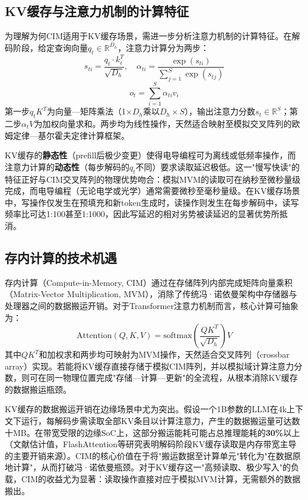 \subsection{KV缓存与注意力机制的计算特征}

为理解为何CIM适用于KV缓存场景，需进一步分析注意力机制的计算特征。在解码阶段，给定查询向量$q_t \in \mathbb{R}^{D_h}$，注意力计算分为两步：
\begin{equation}
s_{ti} = \frac{q_t \cdot k_i^T}{\sqrt{D_h}}, \quad \alpha_{ti} = \frac{\exp(s_{ti})}{\sum_{j=1}^{S} \exp(s_{tj})}
\label{eq:attention_scores}
\end{equation}
\begin{equation}
o_t = \sum_{i=1}^{S} \alpha_{ti} v_i
\label{eq:attention_output_detail}
\end{equation}
第一步$q_t K^T$为向量—矩阵乘法（1$\times D_h$乘以$D_h \times S$），输出注意力分数$s_t \in \mathbb{R}^S$；第二步$\alpha_t V$为加权向量求和。两步均为线性操作，天然适合映射至模拟交叉阵列的欧姆定律—基尔霍夫定律计算框架。

KV缓存的\textbf{静态性}（prefill后极少变更）使得电导编程可为离线或低频率操作，而注意力计算的\textbf{动态性}（每步解码的$q_t$不同）要求读取延迟极低。这一"慢写快读"的特征正好与CIM交叉阵列的物理优势吻合：模拟MVM的读取可在纳秒至微秒量级完成，而电导编程（无论电学或光学）通常需要微秒至毫秒量级。在KV缓存场景中，写操作仅发生在预填充和新token生成时，读操作则发生在每步解码中，读写频率比可达1:100甚至1:1000，因此写延迟的相对劣势被读延迟的显著优势所抵消。

\subsection{存内计算的技术机遇}

存内计算（Compute-in-Memory, CIM）通过在存储阵列内部完成矩阵向量乘积（Matrix-Vector Multiplication, MVM），消除了传统冯·诺依曼架构中存储器与处理器之间的数据搬运开销。对于Transformer注意力机制而言，核心计算可抽象为：
\begin{equation}
\text{Attention}(Q, K, V) = \text{softmax}\left(\frac{QK^T}{\sqrt{D_h}}\right)V
\label{eq:attention}
\end{equation}
其中$QK^T$和加权求和两步均可映射为MVM操作，天然适合交叉阵列（crossbar array）实现。若能将KV缓存直接存储于模拟CIM阵列，并以模拟域计算注意力分数，则可在同一物理位置完成"存储—计算—更新"的全流程，从根本消除KV缓存的数据搬运瓶颈。

KV缓存的数据搬运开销在边缘场景中尤为突出。假设一个1B参数的LLM在4k上下文下运行，每解码步需读取全部KV条目以计算注意力，产生的数据搬运量可达数十MB。在带宽受限的边缘SoC上，这部分搬运能耗可能占总推理能耗的\textbf{30\%}以上（文献估计值，FlashAttention等研究表明解码阶段KV缓存读取是内存带宽主导的主要开销来源）。CIM的核心价值在于将"搬运数据至计算单元"转化为"在数据原地计算"，从而打破冯·诺依曼瓶颈。对于KV缓存这一"高频读取、极少写入"的负载，CIM的收益尤为显著：读取操作直接对应于模拟MVM计算，无需额外的数据搬出。

